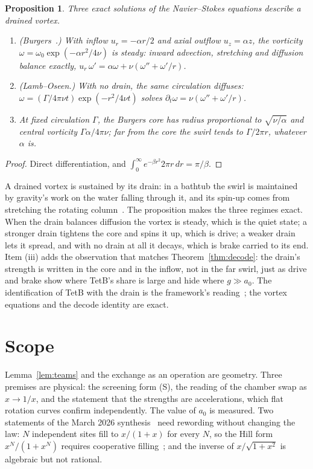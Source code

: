 \documentclass[twocolumn]{iopjournal}
\newtheorem{proposition}{Proposition}
\theoremstyle{definition}
\theoremstyle{remark}
\begin{document}
\begin{proposition}\label{prop:vortex}
Three exact solutions of the Navier--Stokes equations describe a drained
vortex.
\begin{enumerate}
\item[(i)] (Burgers~\cite{Burgers1948}.) With inflow $u_r = -\alpha r/2$
  and axial outflow $u_z = \alpha z$, the vorticity
  $\omega = \omega_0\exp(-\alpha r^2/4\nu)$ is steady: inward advection,
  stretching and diffusion balance exactly,
  $u_r\,\omega' = \alpha\omega + \nu(\omega'' + \omega'/r)$.
\item[(ii)] (Lamb--Oseen.) With no drain, the same circulation diffuses:
  $\omega = (\Gamma/4\pi\nu t)\exp(-r^2/4\nu t)$ solves
  $\partial_t\omega = \nu(\omega'' + \omega'/r)$.
\item[(iii)] At fixed circulation $\Gamma$, the Burgers core has radius
  proportional to $\sqrt{\nu/\alpha}$ and central vorticity
  $\Gamma\alpha/4\pi\nu$; far from the core the swirl tends to
  $\Gamma/2\pi r$, whatever $\alpha$ is.
\end{enumerate}
\end{proposition}

\begin{proof}
Direct differentiation, and $\int_0^\infty e^{-\beta r^2}2\pi r\,dr =
\pi/\beta$.
\end{proof}

A drained vortex is sustained by its drain: in a bathtub the swirl is
maintained by gravity's work on the water falling through it, and its
spin-up comes from stretching the rotating column~\cite{Lautrup}. The
proposition makes the three regimes exact. When the drain balances
diffusion the vortex is steady, which is the quiet state; a stronger drain
tightens the core and spins it up, which is drive; a weaker drain lets it
spread, and with no drain at all it decays, which is brake carried to its
end. Item (iii) adds the observation that matches Theorem~\ref{thm:decode}:
the drain's strength is written in the core and in the inflow, not in the
far swirl, just as drive and brake show where TetB's share is large and
hide where $g \gg a_0$. The identification of TetB with the drain is the
framework's reading~\cite{NelsonHourglass}; the vortex equations and the
decode identity are exact.

\section*{Scope}

Lemma~\ref{lem:teams} and the exchange as an operation are geometry. Three
premises are physical: the screening form (S), the reading of the chamber
swap as $x \to 1/x$, and the statement that the strengths are
accelerations, which flat rotation curves confirm independently. The value
of $a_0$ is measured. Two statements of the March 2026
synthesis~\cite{NelsonSynth} need rewording without changing the law: $N$
independent sites fill to $x/(1+x)$ for every $N$, so the Hill form
$x^N/(1+x^N)$ requires cooperative filling~\cite{Hill1910,Langmuir1918};
and the inverse of $x/\sqrt{1+x^2}$ is algebraic but not rational.
\end{document}
